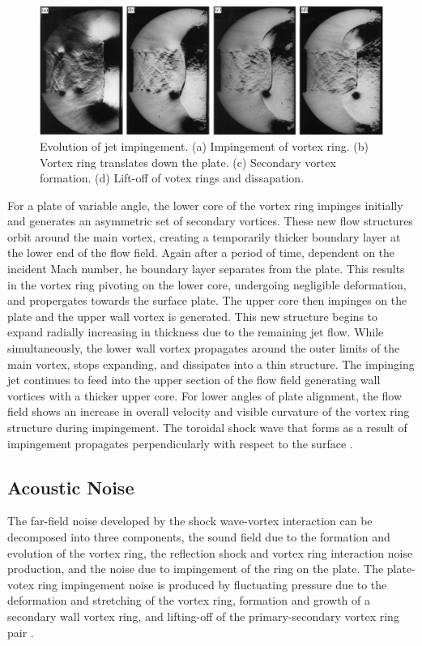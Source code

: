 \begin{figure}[h] 
	\centering
	\includegraphics[width=1\textwidth]{fig4.PNG} 
	\caption{Evolution of jet impingement. (a) Impingement of vortex ring. (b) Vortex ring translates down the plate. (c) Secondary vortex formation. (d) Lift-off of votex rings and dissapation. \cite{szumowski2000starting}}
	\label{fig:4}
\end{figure}
For a plate of variable angle, the lower core of the vortex ring impinges initially and generates an asymmetric set of secondary vortices. These new flow structures orbit around the main vortex, creating a temporarily thicker boundary layer at the lower end of the flow field. Again after a period of time, dependent on the incident Mach number, he boundary layer separates from the plate. This results in the vortex ring pivoting on the lower core, undergoing negligible deformation, and propergates towards the surface plate. The upper core then impinges on the plate and the upper wall vortex is generated. This new structure begins to expand radially increasing in thickness due to the remaining jet flow. While simultaneously, the lower wall vortex propagates around the outer limits of the main vortex, stops expanding, and dissipates into a thin structure. The impinging jet continues to feed into the upper section of the flow field generating wall vortices with a thicker upper core. For lower angles of plate alignment, the flow field shows an increase in overall velocity and visible curvature of the vortex ring structure during impingement. The toroidal shock wave that forms as a result of impingement propagates perpendicularly with respect to the surface \cite{mariani2013head}.  

\subsection{Acoustic Noise}
The far-field noise developed by the shock wave-vortex interaction can be decomposed into three components, the sound field due to the formation and evolution of the vortex ring, the reflection shock and vortex ring interaction noise production, and the noise due to impingement of the ring on the plate. The plate-votex ring impingement noise is produced by fluctuating pressure due to the deformation and stretching of the vortex ring, formation and growth of a secondary wall vortex ring, and lifting-off of the primary-secondary vortex ring pair \cite{murugan2010characteristics}.


